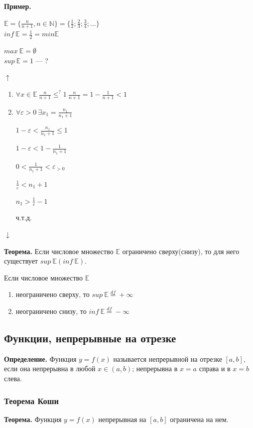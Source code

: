 \documentclass{article}
\begin{document}
    \textbf{Пример.}
    
    \( \mathbb{E} = \{ \frac{n}{n + 1}, n \in \mathbb{N} \} = \{ \frac{1}{2}; \frac{2}{3}; \frac{3}{4}; ... \} \)\\
    \( inf\ \mathbb{E} = \frac{1}{2} = min \mathbb{E} \)

    \(max\ \mathbb{E} = \emptyset\)\\
    \(sup\ \mathbb{E} = 1\) --- ?

    \(\uparrow\)
    \begin{enumerate}
        \item \(\forall x \in \mathbb{E}\ \frac{n}{n+1} \leq^{?} 1\ \frac{n}{n+1} = 1 - \frac{1}{n+1} < 1\)
        \item \( \forall \varepsilon > 0\ \exists x_1 = \frac{n_1}{n_1 + 1} \)
        
        \( 1 - \varepsilon < \frac{n_1}{n_1 + 1} \leq 1 \)

        \( 1 - \varepsilon < 1 - \frac{1}{n_1 + 1} \)
        
        \( 0 < \frac{1}{n_1 + 1} < \varepsilon_{> 0} \)

        \( \frac{1}{\varepsilon} < n_1 + 1 \)

        \( n_1 > \frac{1}{\varepsilon} - 1\)
        
        ч.т.д.
    \end{enumerate}
    \(\downarrow\)
    
    \textbf{Теорема.} Если числовое множество \(\mathbb{E}\) ограничено сверху(снизу), то для него существует \(sup\ \mathbb{E}(inf\ \mathbb{E})\).

    Если числовое множество \(\mathbb{E}\)  
    \begin{enumerate}
        \item неограничено сверху, то \(sup\ \mathbb{E} \stackrel{df}{=} +\infty\)
        \item неограничено снизу, то \(inf\ \mathbb{E} \stackrel{df}{=} -\infty\)
    \end{enumerate}

    \subsection{Функции, непрерывные на отрезке}
    \textbf{Определение.} Функция \( y = f(x) \) называется непрерывной на отрезке \( [a, b] \), если она непрерывна в любой \( x \in (a, b) \); непрерывна в \( x = a \) справа и в \( x = b \) слева.


    \subsubsection{Теорема Коши}
    \textbf{Теорема.} Функция \( y = f(x) \) непрерывная на \( [a, b] \) ограничена на нем.
\end{document}
